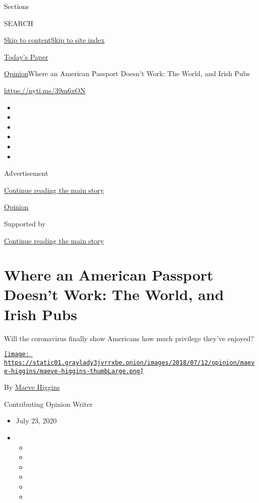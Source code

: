 Sections

SEARCH

\protect\hyperlink{site-content}{Skip to
content}\protect\hyperlink{site-index}{Skip to site index}

\href{https://myaccount.nytimes3xbfgragh.onion/auth/login?response_type=cookie\&client_id=vi}{}

\href{https://www.nytimes3xbfgragh.onion/section/todayspaper}{Today's
Paper}

\href{/section/opinion}{Opinion}\textbar{}Where an American Passport
Doesn't Work: The World, and Irish Pubs

\url{https://nyti.ms/39m6xON}

\begin{itemize}
\item
\item
\item
\item
\item
\item
\end{itemize}

Advertisement

\protect\hyperlink{after-top}{Continue reading the main story}

\href{/section/opinion}{Opinion}

Supported by

\protect\hyperlink{after-sponsor}{Continue reading the main story}

\hypertarget{where-an-american-passport-doesnt-work-the-world-and-irish-pubs}{%
\section{Where an American Passport Doesn't Work: The World, and Irish
Pubs}\label{where-an-american-passport-doesnt-work-the-world-and-irish-pubs}}

Will the coronavirus finally show Americans how much privilege they've
enjoyed?

\href{https://www.nytimes3xbfgragh.onion/by/maeve-higgins}{\texttt{[image: https://static01.graylady3jvrrxbe.onion/images/2018/07/12/opinion/maeve-higgins/maeve-higgins-thumbLarge.png]}}

By \href{https://www.nytimes3xbfgragh.onion/by/maeve-higgins}{Maeve
Higgins}

Contributing Opinion Writer

\begin{itemize}
\item
  July 23, 2020
\item
  \begin{itemize}
  \item
  \item
  \item
  \item
  \item
  \item
  \end{itemize}
\end{itemize}

